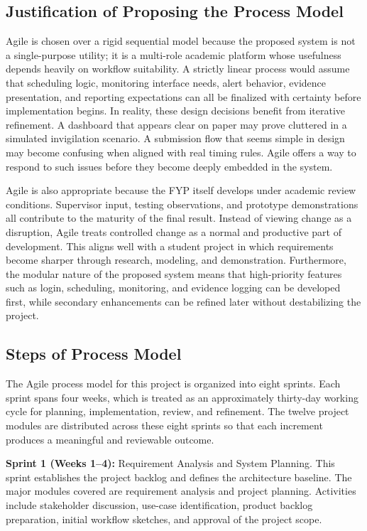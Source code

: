 \subsection{Justification of Proposing the Process Model}

Agile is chosen over a rigid sequential model because the proposed system is not a single-purpose utility; it is a multi-role academic platform whose usefulness depends heavily on workflow suitability. A strictly linear process would assume that scheduling logic, monitoring interface needs, alert behavior, evidence presentation, and reporting expectations can all be finalized with certainty before implementation begins. In reality, these design decisions benefit from iterative refinement. A dashboard that appears clear on paper may prove cluttered in a simulated invigilation scenario. A submission flow that seems simple in design may become confusing when aligned with real timing rules. Agile offers a way to respond to such issues before they become deeply embedded in the system.

Agile is also appropriate because the FYP itself develops under academic review conditions. Supervisor input, testing observations, and prototype demonstrations all contribute to the maturity of the final result. Instead of viewing change as a disruption, Agile treats controlled change as a normal and productive part of development. This aligns well with a student project in which requirements become sharper through research, modeling, and demonstration. Furthermore, the modular nature of the proposed system means that high-priority features such as login, scheduling, monitoring, and evidence logging can be developed first, while secondary enhancements can be refined later without destabilizing the project.

\subsection{Steps of Process Model}

The Agile process model for this project is organized into eight sprints. Each sprint spans four weeks, which is treated as an approximately thirty-day working cycle for planning, implementation, review, and refinement. The twelve project modules are distributed across these eight sprints so that each increment produces a meaningful and reviewable outcome.

\textbf{Sprint 1 (Weeks 1--4):} Requirement Analysis and System Planning. This sprint establishes the project backlog and defines the architecture baseline. The major modules covered are requirement analysis and project planning. Activities include stakeholder discussion, use-case identification, product backlog preparation, initial workflow sketches, and approval of the project scope.

